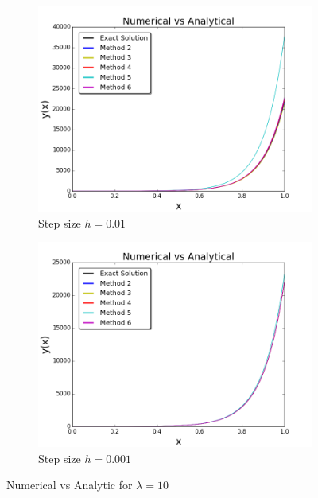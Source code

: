 \documentclass[12pt]{article}
\theoremstyle{remark}
\begin{document}
\begin{figure}[H]
	\centering
	\begin{subfigure}{.55\textwidth}
		\centering
		\includegraphics[width=1\linewidth]{reg_10_01.png}
		\caption{Step size $h = 0.01$}
		\label{fig:sub1}
	\end{subfigure}%
	\begin{subfigure}{.55\textwidth}
		\centering
		\includegraphics[width=1\linewidth]{reg_10_001.png}
		\caption{Step size $h = 0.001$}
		\label{fig:sub2}
	\end{subfigure}
	\caption{Numerical vs Analytic for $\lambda = 10$}
	\label{fig:test}
\end{figure}
\end{document}
